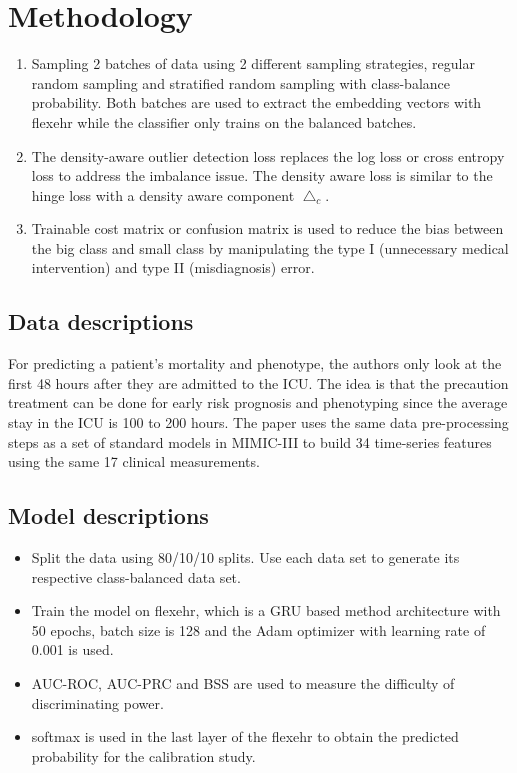 \documentclass[11pt,a4paper]{article}
\begin{document}
\section{Methodology}

\begin{enumerate}
    \item Sampling 2 batches of data using 2 different sampling strategies, regular random sampling and stratified random sampling with class-balance probability. Both batches are used to  extract the embedding vectors with flexehr while the classifier only trains on the balanced batches.  
    \item The density-aware outlier detection loss replaces the log loss or cross entropy loss to address the imbalance issue. The density aware loss is similar to the hinge loss with a density aware component $\bigtriangleup_c$.
    \item Trainable cost matrix or confusion matrix is used to reduce the bias between the big class and small class by manipulating the type I (unnecessary medical intervention) and type II (misdiagnosis) error.   
\end{enumerate}

\subsection{Data descriptions}
For predicting a patient's mortality and phenotype, the authors only look at the first 48 hours after they are admitted to the ICU. The idea is that the precaution treatment can be done for early risk prognosis and phenotyping since the average stay in the ICU is 100 to 200 hours. The paper uses the same data pre-processing steps as a set of standard models in MIMIC-III \cite{mimiciiibenchmark} to build 34 time-series features using the same 17 clinical measurements. 

\subsection{Model descriptions}
\begin{itemize}
    \item Split the data using 80/10/10 splits. Use each data set to generate its respective class-balanced data set. 
    \item Train the model on flexehr, which is a GRU based method architecture with 50 epochs, batch size is 128 and the Adam optimizer with learning rate of 0.001 is used.
    \item AUC-ROC, AUC-PRC and BSS are used to measure the difficulty of discriminating power. 
    \item softmax is used in the last layer of the flexehr to obtain the predicted probability for the calibration study.  
\end{itemize}
\end{document}
